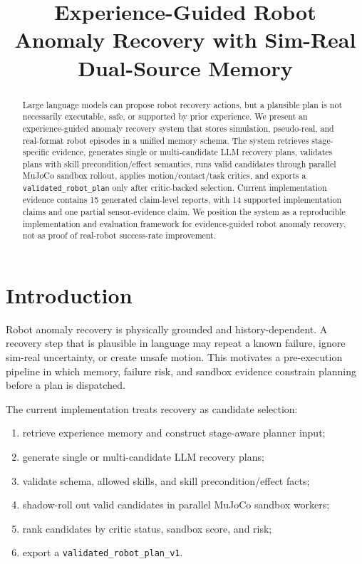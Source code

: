 \documentclass[conference]{IEEEtran}
\title{Experience-Guided Robot Anomaly Recovery with Sim-Real Dual-Source Memory}
\author{
\IEEEauthorblockN{Anonymous Authors}
\IEEEauthorblockA{Paper draft aligned with the current R1Pro \texttt{experience\_system} implementation}
}
\begin{document}
\maketitle

\begin{abstract}
Large language models can propose robot recovery actions, but a plausible plan is not necessarily executable, safe, or supported by prior experience. We present an experience-guided anomaly recovery system that stores simulation, pseudo-real, and real-format robot episodes in a unified memory schema. The system retrieves stage-specific evidence, generates single or multi-candidate LLM recovery plans, validates plans with skill precondition/effect semantics, runs valid candidates through parallel MuJoCo sandbox rollout, applies motion/contact/task critics, and exports a \texttt{validated\_robot\_plan} only after critic-backed selection. Current implementation evidence contains 15 generated claim-level reports, with 14 supported implementation claims and one partial sensor-evidence claim. We position the system as a reproducible implementation and evaluation framework for evidence-guided robot anomaly recovery, not as proof of real-robot success-rate improvement.
\end{abstract}

\section{Introduction}
Robot anomaly recovery is physically grounded and history-dependent. A recovery step that is plausible in language may repeat a known failure, ignore sim-real uncertainty, or create unsafe motion. This motivates a pre-execution pipeline in which memory, failure risk, and sandbox evidence constrain planning before a plan is dispatched.

The current implementation treats recovery as candidate selection:
\begin{enumerate}
    \item retrieve experience memory and construct stage-aware planner input;
    \item generate single or multi-candidate LLM recovery plans;
    \item validate schema, allowed skills, and skill precondition/effect facts;
    \item shadow-roll out valid candidates in parallel MuJoCo sandbox workers;
    \item rank candidates by critic status, sandbox score, and risk;
    \item export a \texttt{validated\_robot\_plan\_v1}.
\end{enumerate}
\end{document}
